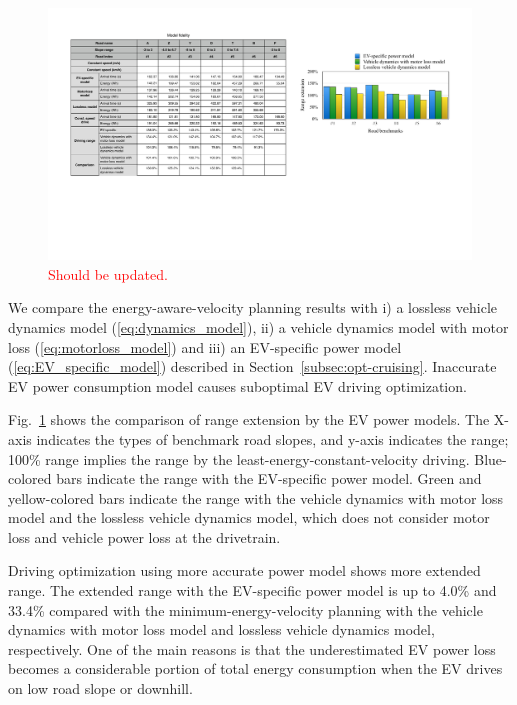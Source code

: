 \documentclass{IEEEtran}
\begin{document}
\begin{figure}	 %
\centering
\includegraphics[width=\hsize]{Figures/model_fidelity.pdf}
\caption{\textcolor{red}{Should be updated.}}
\label{fig:energy_by_model}
\end{figure} 

We compare the energy-aware-velocity planning results with i) a lossless vehicle dynamics model (\ref{eq:dynamics_model}), ii) a vehicle dynamics model with motor loss (\ref{eq:motorloss_model}) and iii) an EV-specific power model (\ref{eq:EV_specific_model}) described in Section~\ref{subsec:opt-cruising}. Inaccurate EV power consumption model causes suboptimal EV driving optimization.

Fig.~\ref{fig:energy_by_model} shows the comparison of range extension by the EV power models. The X-axis indicates the types of benchmark road slopes, and y-axis indicates the range; 100\%  range implies the range by the least-energy-constant-velocity driving. Blue-colored bars indicate the range with the EV-specific power model. Green and yellow-colored bars indicate the range with the vehicle dynamics with motor loss model and the lossless vehicle dynamics model, which does not consider motor loss and vehicle power loss at the drivetrain.

Driving optimization using more accurate power model shows more extended range. The extended range with the EV-specific power model is up to 4.0\% and 33.4\% compared with the minimum-energy-velocity planning with the vehicle dynamics with motor loss model and lossless vehicle dynamics model, respectively. One of the main reasons is that the underestimated EV power loss becomes a considerable portion of total energy consumption when the EV drives on low road slope or downhill.
\end{document}

